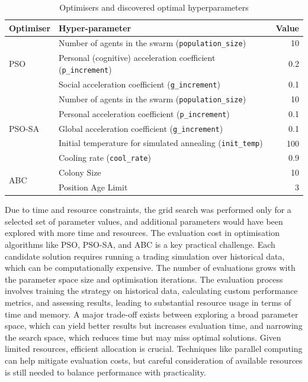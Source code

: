 \documentclass[a4paper, 12pt]{extarticle}
\begin{document}
\begin{table}[ht]
    \centering
    \label{tab:optimizers}
    \begin{tabular}{llr}
      \toprule
      \textbf{Optimiser} & \textbf{Hyper-parameter}                          & \textbf{Value} \\ 
      \midrule
      \multirow{3}{*}{PSO}      
        & Number of agents in the swarm (\texttt{population\_size})       & 10   \\
        & Personal (cognitive) acceleration coefficient (\texttt{p\_increment}) & 0.2  \\
        & Social acceleration coefficient (\texttt{g\_increment})         & 0.1  \\
      \midrule
      \multirow{5}{*}{PSO-SA}   
        & Number of agents in the swarm (\texttt{population\_size})       & 10   \\
        & Personal acceleration coefficient (\texttt{p\_increment})      & 0.1  \\
        & Global acceleration coefficient (\texttt{g\_increment})        & 0.1  \\
        & Initial temperature for simulated annealing (\texttt{init\_temp}) & 100  \\
        & Cooling rate (\texttt{cool\_rate})                             & 0.9  \\
      \midrule
      \multirow{2}{*}{ABC}      
        & Colony Size                                                   & 10   \\
        & Position Age Limit                                            & 3    \\
      \bottomrule
    \end{tabular}
    \caption{Optimisers and discovered optimal hyperparameters}
\end{table}

Due to time and resource constraints, the grid search was performed only for a selected set of parameter values, and additional parameters would have been explored with more time and resources. The evaluation cost in optimisation algorithms like PSO, PSO-SA, and ABC is a key practical challenge. Each candidate solution requires running a trading simulation over historical data, which can be computationally expensive. The number of evaluations grows with the parameter space size and optimisation iterations. The evaluation process involves training the strategy on historical data, calculating custom performance metrics, and assessing results, leading to substantial resource usage in terms of time and memory. A major trade-off exists between exploring a broad parameter space, which can yield better results but increases evaluation time, and narrowing the search space, which reduces time but may miss optimal solutions. Given limited resources, efficient allocation is crucial. Techniques like parallel computing can help mitigate evaluation costs, but careful consideration of available resources is still needed to balance performance with practicality. 
\end{document}
